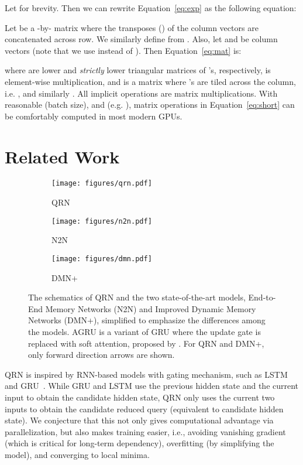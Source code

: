 \documentclass[table]{article}
\begin{document}
Let  for brevity.
Then we can rewrite Equation~\ref{eq:exp} as the following equation:


Let  
be a -by- matrix where the transposes () of the column vectors  are concatenated across row.
We similarly define  from . 
Also, let  and  be column vectors (note that we use  instead of ).
Then Equation~\ref{eq:mat} is: 

where  are lower and \emph{strictly} lower triangular matrices of 's, respectively, 
 is element-wise multiplication, and
 is a matrix where  's are tiled across the column, i.e. , 
and similarly . 
All implicit operations are matrix multiplications.
With reasonable  (batch size),  and  (e.g. ), matrix operations in Equation~\ref{eq:short} can be comfortably computed in most modern GPUs.




 
\section{Related Work}\label{sec:rel}





\begin{figure}[t]

\begin{subfigure}[htbp]{0.32\textwidth}
\centering
\texttt{[image: figures/qrn.pdf]}
\caption{  QRN }
\label{fig:qrn}
\end{subfigure}
\begin{subfigure}[htbp]{0.32\textwidth}
\centering
\texttt{[image: figures/n2n.pdf]}
\caption{ N2N~\citep{memN2N} }
\label{fig:memn2n}
\end{subfigure}
\begin{subfigure}[htbp]{0.32\textwidth}
\centering
\texttt{[image: figures/dmn.pdf]}
\caption{ DMN+~\citep{DMN+} }
\label{fig:dmn}
\end{subfigure}
\caption{\small The schematics of QRN and the two state-of-the-art models, End-to-End Memory Networks (N2N) and Improved Dynamic Memory Networks (DMN+), simplified to emphasize the differences among the models. 
AGRU is a variant of GRU where the update gate is replaced with soft attention, proposed by \citet{DMN}.
For QRN and DMN+, only forward direction arrows are shown.}
\label{fig:models}
\end{figure}

QRN is inspired by RNN-based models with gating mechanism, such as LSTM~\citep{lstm} and GRU~\citep{GRU}.
While GRU and LSTM use the previous hidden state and the current input to obtain the candidate hidden state, QRN only uses the current two inputs to obtain the candidate reduced query (equivalent to candidate hidden state).
We conjecture that this not only gives computational advantage via parallelization, but also makes training easier, i.e., avoiding vanishing gradient (which is critical for long-term dependency), overfitting (by simplifying the model), and converging to local minima.
\end{document}
